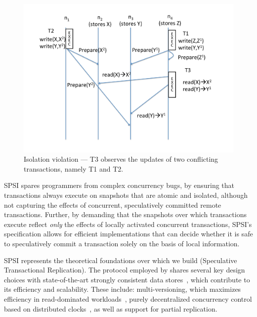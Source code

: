\begin{figure}[t!]
\centering
\hspace{-5mm}
\includegraphics[scale = 0.24]{figures/example2.pdf}
\vspace{-5mm}
\caption{\footnotesize Isolation violation --- T3 observes the updates of two conflicting transactions, namely T1 and T2.}
\label{fig:ex2}
\vspace{-5mm}
\end{figure}
SPSI  spares programmers from complex concurrency bugs, by ensuring that  transactions always execute on snapshots that are atomic and isolated, although not capturing the effects of concurrent, speculatively committed remote transactions. Further, by demanding that the snapshots over which transactions execute reflect \textit{only} the effects of locally activated concurrent transactions, SPSI's specification allows for efficient implementations that can decide whether it is safe to speculatively commit a transaction solely on the basis of local information.


SPSI represents the theoretical foundations over which we build \specula (Speculative Transactional Replication). The protocol employed by \specula  shares several key design choices with state-of-the-art strongly consistent data stores~\cite{spanner,clocksi,peluso2012score}, which contribute to its efficiency and scalability. These include:  multi-versioning, which maximizes efficiency in read-dominated workloads~\cite{bernstein1987concurrency},  purely decentralized concurrency control based on distributed clocks~\cite{spanner,clocksi,peluso2012scalability}, as well as support for partial replication. 


